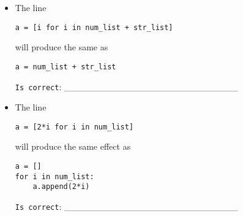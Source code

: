 \documentclass[a4paper,11pt]{scrartcl}
\begin{document}
\begin{itemize}
\item The line
\begin{verbatim}
a = [i for i in num_list + str_list]
\end{verbatim}
will produce the same as
\begin{verbatim}
a = num_list + str_list
\end{verbatim}

\verb|Is correct|: \_\_\_\_\_\_\_\_\_\_\_\_\_\_\_\_\_\_\_\_\_\_\_\_\_\_\_


\item The line
\begin{verbatim}
a = [2*i for i in num_list]
\end{verbatim}
will produce the same effect as
\begin{verbatim}
a = []
for i in num_list:
    a.append(2*i)
\end{verbatim}

\verb|Is correct|: \_\_\_\_\_\_\_\_\_\_\_\_\_\_\_\_\_\_\_\_\_\_\_\_\_\_\_
\end{itemize}
\end{document}
